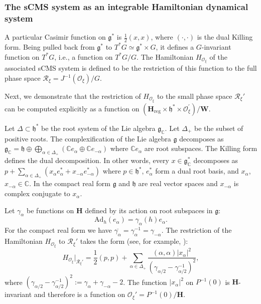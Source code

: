\documentclass[12pt]{amsart}
\theoremstyle{definition}
\numberwithin{equation}{section}
\newcommand{\CC}{\mathbb{C}}
\newcommand{\Reducedxi}{\mathcal{R}_\xi}
\newcommand{\Adjointaction}{\mathrm{Ad}}
\newcommand{\Lieg}{\mathfrak{g}}
\newcommand{\Hreg}{\Cartan_{\mathrm{reg}}}
\newcommand{\Cartan}{\mathbf{H}}
\newcommand{\cartan}{\mathfrak{h}}
\newcommand{\Oprimexi}{\mathcal{O}^{\prime}_{\xi}}
\begin{document}
\subsubsection{The sCMS system as an integrable Hamiltonian dynamical system}

A particular Casimir function on $\mathfrak{g^*}$ is $\frac{1}{2}(x,x)$,  where $(\cdot,\cdot)$ is the dual Killing form. Being pulled back from $\mathfrak{g^*}$ to $T^*G\simeq \mathfrak{g^*}\times G$, it defines a $G$-invariant function on $T^*G$, i.e., a function on $T^*G/G$. 
The Hamiltonian  $H_{\mathcal{O}_\xi}$ of the associated sCMS  system is defined to be the restriction of this function to the full phase space $\Reducedxi=J^{-1}(\mathcal{O}_\xi)/G$. 

Next, we demonstrate that the restriction of   $H_{\mathcal{O}_\xi}$ to the small phase space $\Reducedxi'$ can be computed explicitly as a function on $(\Hreg \times \cartan^* \times \Oprimexi)/\mathbf{W}$.





Let   \(\Delta \subset \cartan^*\)  be the root system of the Lie algebra \(\Lieg_\CC\). Let $\Delta_+$ be the subset of positive roots. The complexification of the Lie algebra $\Lieg$ decomposes as $\mathfrak{g}_\CC=\cartan\oplus \bigoplus_{\alpha\in \Delta_+} (\CC e_\alpha\oplus  \CC e_{-\alpha})$ where $\CC e_\alpha$ are root subspaces. The Killing form defines the dual decomposition. In other words, every $x\in \mathfrak{g}_\CC^*$ decomposes as $p+\sum_{\alpha\in \Delta_+} (x_\alpha e^*_\alpha+ x_{-\alpha}e^*_{-\alpha})$ where $p\in \cartan^*$,  $e^*_{\alpha}$ form a dual root basis, and $x_\alpha$, $x_{-\alpha}\in \CC$. In the compact real form $\mathfrak{g}$ and $\cartan$ are  real vector spaces and $x_{-\alpha}$ is complex conjugate to $x_\alpha$. 


Let \(\gamma_{\alpha}\) be functions on \(\Cartan\) defined by its action on root subspaces in $\mathfrak{g}$:
	\[
	\Adjointaction_{h}(e_{\alpha}) = \gamma_{\alpha}(h) e_{\alpha}.
	\]
For the compact real form we have $\overline{\gamma_{\alpha}}=\gamma_{\alpha}^{-1}=\gamma_{-\alpha}$.
The restriction of the Hamiltonian $H_{\mathcal{O}_\xi}$ to $\Reducedxi'$ takes the form (see, for example, \cite{NR2003}):
\[
H_{\mathcal{O}_\xi}|_{\Reducedxi'}= \frac{1}{2}(p, p) + \sum_{\alpha \in \Delta_{+}} \frac{(\alpha, \alpha) |x_\alpha|^2}{\left(\gamma_{\alpha / 2}-\gamma_{\alpha / 2}^{-1}\right)^2},
\]
where \(\left(\gamma_{\alpha / 2} - \gamma_{\alpha / 2}^{-1}\right)^2 := \gamma_{\alpha} + \gamma_{-\alpha} - 2\). The function $|x_\alpha|^2$ on $P^{-1}(0)$ is $\Cartan$-invariant and therefore is a function on $\mathcal{O}_\xi'=P^{-1}(0)/\Cartan$.
 
\end{document}
